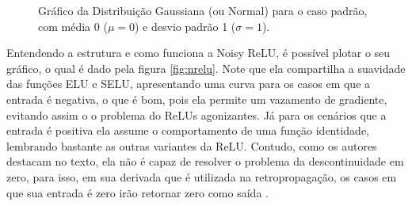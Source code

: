 \begin{figure}[htbp]
    \centering
    \caption{Gráfico da Distribuição Gaussiana (ou Normal) para o caso padrão, com média 0 ($\mu = 0$) e desvio padrão 1 ($\sigma = 1$).}
    \label{fig:distribuicao-normal-padrao}
\end{figure}

Entendendo a estrutura e como funciona a Noisy ReLU, é possível plotar o seu gráfico, o qual é dado pela figura \ref{fig:nrelu}. Note que ela compartilha a suavidade das funções ELU e SELU, apresentando uma curva para os casos em que a entrada é negativa, o que é bom, pois ela permite um vazamento de gradiente, evitando assim o o problema do ReLUs agonizantes. Já para os cenários que a entrada é positiva ela assume o comportamento de uma função identidade, lembrando bastante as outras variantes da ReLU. Contudo, como os autores destacam no texto, ela não é capaz de resolver o problema da descontinuidade em zero, para isso, em sua derivada que é utilizada na retropropagação, os casos em que sua entrada é zero irão retornar zero como saída \parencite{Nair2010}.

